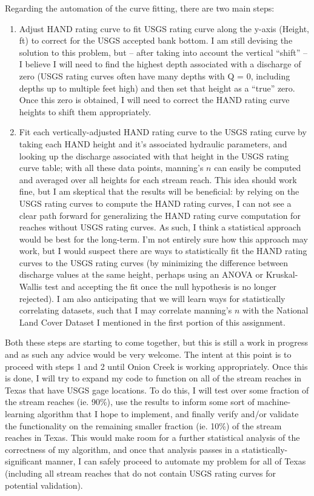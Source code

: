 \documentclass[11pt]{article}
\begin{document}
\clearpage

\noindent
Regarding the automation of the curve fitting, there are two main steps: 

\begin{enumerate}
  \item Adjust HAND rating curve to fit USGS rating curve along the y-axis (Height, ft) to correct for the USGS accepted bank bottom. I am still devising the solution to this problem, but -- after taking into account the vertical ``shift'' -- I believe I will need to find the highest depth associated with a discharge of zero (USGS rating curves often have many depths with Q = 0, including depths up to multiple feet high) and then set that height as a ``true'' zero. Once this zero is obtained, I will need to correct the HAND rating curve heights to shift them appropriately. 
  \vspace{1ex}
  \item Fit each vertically-adjusted HAND rating curve to the USGS rating curve by taking each HAND height and it's associated hydraulic parameters, and looking up the discharge associated with that height in the USGS rating curve table; with all these data points, manning's $n$ can easily be computed and averaged over all heights for each stream reach. This idea should work fine, but I am skeptical that the results will be beneficial: by relying on the USGS rating curves to compute the HAND rating curves, I can not see a clear path forward for generalizing the HAND rating curve computation for reaches without USGS rating curves. As such, I think a statistical approach would be best for the long-term. I'm not entirely sure how this approach may work, but I would suspect there are ways to statistically fit the HAND rating curves to the USGS rating curves (by minimizing the difference between discharge values at the same height, perhaps using an ANOVA or Kruskal-Wallis test and accepting the fit once the null hypothesis is no longer rejected). I am also anticipating that we will learn ways for statistically correlating datasets, such that I may correlate manning's $n$ with the National Land Cover Dataset I mentioned in the first portion of this assignment. 
\end{enumerate}

Both these steps are starting to come together, but this is still a work in progress and as such any advice would be very welcome. The intent at this point is to proceed with steps 1 and 2 until Onion Creek is working appropriately. Once this is done, I will try to expand my code to function on all of the stream reaches in Texas that have USGS gage locations. To do this, I will test over some fraction of the stream reaches (ie. 90\%), use the results to inform some sort of machine-learning algorithm that I hope to implement, and finally verify and/or validate the functionality on the remaining smaller fraction (ie. 10\%) of the stream reaches in Texas. This would make room for a further statistical analysis of the correctness of my algorithm, and once that analysis passes in a statistically-significant manner, I can safely proceed to automate my problem for all of Texas (including all stream reaches that do not contain USGS rating curves for potential validation). \\
\end{document}
